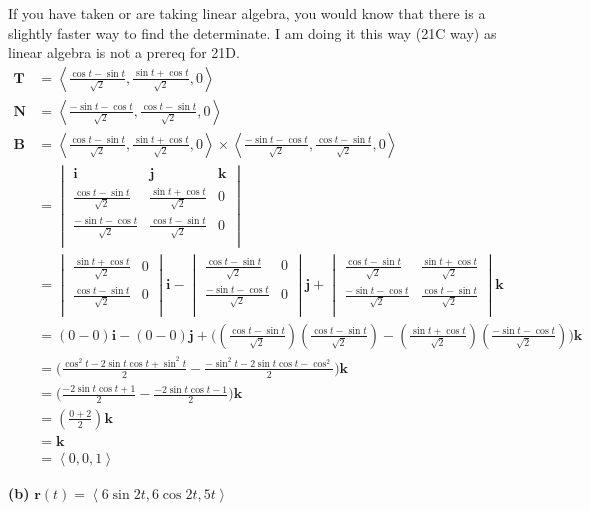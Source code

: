 \documentclass{article}
\newcommand{\lrp}[1]{\left( #1 \right)}
\newcommand{\lra}[1]{\left\langle #1 \right\rangle}
\renewcommand{\k}[0]{\mathbf{k}}
\newcommand{\T}[0]{\mathbf{T}}
\newcommand{\N}[0]{\mathbf{N}}
\newcommand{\B}[0]{\mathbf{B}}
\renewcommand{\r}[0]{\mathbf{r}}
\begin{document}
If you have taken or are taking linear algebra, you would know that there is a slightly faster way to find the determinate. I am doing it this way (21C way) as linear algebra is not a prereq for 21D.
\begin{align*}
    \T&=\lra{\frac{\cos t-\sin t}{\sqrt{2}},\frac{\sin t + \cos t}{\sqrt{2}},0}\\
    \N&=\lra{\frac{-\sin t-\cos t}{\sqrt{2}},\frac{\cos t-\sin t}{\sqrt{2}},0}\\
    \B&=\lra{\frac{\cos t-\sin t}{\sqrt{2}},\frac{\sin t + \cos t}{\sqrt{2}},0}\times \lra{\frac{-\sin t-\cos t}{\sqrt{2}},\frac{\cos t-\sin t}{\sqrt{2}},0}\\
    &=\begin{vmatrix}
\mathbf{i} & \mathbf{j} & \mathbf{k}\\
\frac{\cos t-\sin t}{\sqrt{2}} & \frac{\sin t + \cos t}{\sqrt{2}} & 0\\
\frac{-\sin t-\cos t}{\sqrt{2}} & \frac{\cos t-\sin t}{\sqrt{2}} & 0\\
\end{vmatrix}\\
&=\begin{vmatrix}
\frac{\sin t + \cos t}{\sqrt{2}} & 0\\
\frac{\cos t-\sin t}{\sqrt{2}} &0\\
\end{vmatrix}\mathbf{i}-
\begin{vmatrix}
\frac{\cos t-\sin t}{\sqrt{2}} & 0\\
\frac{-\sin t-\cos t}{\sqrt{2}} & 0\\
\end{vmatrix}\mathbf{j}+
\begin{vmatrix}
\frac{\cos t-\sin t}{\sqrt{2}} & \frac{\sin t + \cos t}{\sqrt{2}}\\
\frac{-\sin t-\cos t}{\sqrt{2}} & \frac{\cos t-\sin t}{\sqrt{2}}\\
\end{vmatrix}\mathbf{k}\\
&=(0-0)\mathbf{i}-(0-0)\mathbf{j}+\Bigg(\left(\frac{\cos t-\sin t}{\sqrt{2}}\right)\left(\frac{\cos t-\sin t}{\sqrt{2}}\right)-\left(\frac{\sin t + \cos t}{\sqrt{2}}\right)\left(\frac{-\sin t-\cos t}{\sqrt{2}}\right)\Bigg)\mathbf{k}\\
&=\Bigg(\frac{\cos^2 t - 2\sin t\cos t+\sin ^2 t}{2}-\frac{-\sin^2 t -2\sin t\cos t -\cos^2}{2}\Bigg)\k\\
&=\Bigg(\frac{-2\sin t\cos t+ 1}{2}-\frac{-2\sin t\cos t-1}{2}\Bigg)\k\tag{$\sin ^2 t+\cos ^2 t = 1$}\\
&=\lrp{\frac{0+2}{2}}\k\\
&=\k\\
&=\boxed{\lra{0,0,1}}
\end{align*}
\newpage
{}
{}\textbf{(b)} $\r(t)=\lra{6\sin 2t,6\cos 2t, 5t}$
\end{document}
